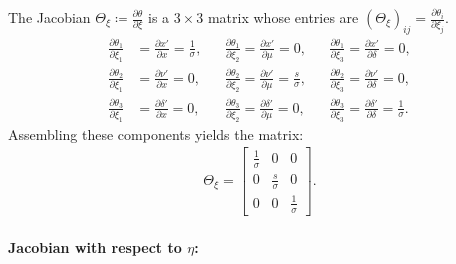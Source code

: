 \documentclass{article}
\begin{document}
The Jacobian $\Theta_\xi \coloneqq \frac{\partial \theta}{\partial \xi}$ is a $3 \times 3$ matrix whose entries are $(\Theta_\xi)_{ij} = \frac{\partial \theta_i}{\partial \xi_j}$.
%
\begin{align}
  \frac{\partial \theta_1}{\partial \xi_1} & = \frac{\partial x'}{\partial x} = \frac{1}{\sigma}, &  & \frac{\partial \theta_1}{\partial \xi_2} = \frac{\partial x'}{\partial \mu} = 0,                  &  & \frac{\partial \theta_1}{\partial \xi_3} = \frac{\partial x'}{\partial \delta} = 0,                     \\
  \frac{\partial \theta_2}{\partial \xi_1} & = \frac{\partial \nu'}{\partial x} = 0,              &  & \frac{\partial \theta_2}{\partial \xi_2} = \frac{\partial \nu'}{\partial \mu} = \frac{s}{\sigma}, &  & \frac{\partial \theta_2}{\partial \xi_3} = \frac{\partial \nu'}{\partial \delta} = 0,                   \\
  \frac{\partial \theta_3}{\partial \xi_1} & = \frac{\partial \delta'}{\partial x} = 0,           &  & \frac{\partial \theta_3}{\partial \xi_2} = \frac{\partial \delta'}{\partial \mu} = 0,             &  & \frac{\partial \theta_3}{\partial \xi_3} = \frac{\partial \delta'}{\partial \delta} = \frac{1}{\sigma}.
\end{align}
%
Assembling these components yields the matrix:
%
\begin{align}
  \Theta_{\xi} =
  \begin{bmatrix}
    \frac{1}{\sigma} & 0                & 0                \\
    0                & \frac{s}{\sigma} & 0                \\
    0                & 0                & \frac{1}{\sigma}
  \end{bmatrix}.
\end{align}

\paragraph{Jacobian with respect to $\eta$:}
\end{document}
